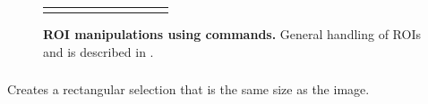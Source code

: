 \begin{figure}[h]
\begin{spacing}{0.69999999999999996}
\noindent {\footnotesize }%
\begin{tabular}{>{\centering}m{}>{\centering}m{}>{\centering}m{}>{\centering}m{}>{\centering}m{}>{\centering}m{}>{\centering}m{}>{\centering}m{}>{\centering}m{}>{\centering}m{}}
\noindent \centering{}{\footnotesize Original} & \noindent \centering{}{\footnotesize \nameref{sub:Fit-Spline}} & \noindent \centering{}{\footnotesize \nameref{sub:Fit-Circle}} & \noindent \centering{}{\footnotesize \nameref{sub:Fit-Ellipse}} & \noindent \centering{}{\footnotesize \nameref{sub:Convex-Hull}} & \noindent \centering{}{\footnotesize \nameref{sub:Make-Inverse}} & \noindent \centering{}{\footnotesize \nameref{sub:Create-Mask}} & \noindent \centering{}{\footnotesize \nameref{sub:Area-to-Line}} & \noindent \centering{}{\footnotesize \nameref{sub:Make-Band...}} & \noindent \centering{}{\footnotesize \nameref{sub:To-Bounding-Box}}\tabularnewline
\end{tabular}{\footnotesize \par}


\noindent \caption[ROI manipulations]{\textbf{\label{fig:ROI-manipulations}ROI manipulations using \protect{}
commands. }General handling of ROIs and 
is described in .}
\end{spacing}
\end{figure}



\subsubsection{\protect{}\label{sub:Select-All-[a]}}

Creates a rectangular selection that is the same size as the image. 


